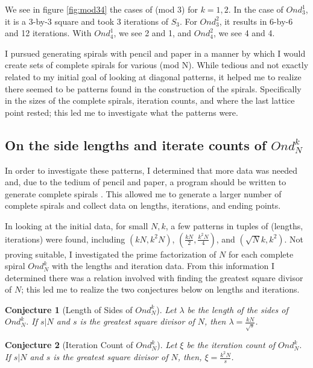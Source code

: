 \documentclass[11pt]{amsart}
\theoremstyle{mydef}
\newtheorem{conj}{Conjecture}[section]
\begin{document}
We see in figure \ref{fig:mod34} the cases of (mod 3) for $k=1,2$.  In the case of $Ond^1_3$, it is a 3-by-3 square and took 3 iterations of $S_3$. For $Ond^2_3$, it results in 6-by-6 and 12 iterations. With $Ond^1_4$, we see 2 and 1, and $Ond^2_4$, we see 4 and 4.

I pursued generating spirals with pencil and paper in a manner by which I would create sets of complete spirals for various (mod N). While tedious and not exactly related to my initial goal of looking at diagonal patterns, it helped me to realize there seemed to be patterns found in the construction of the spirals. Specifically in the sizes of the complete spirals, iteration counts, and where the last lattice point rested; this led me to investigate what the patterns were.

\subsection{On the side lengths and iterate counts of $Ond^k_N$}
In order to investigate these patterns, I determined that more data was needed and, due to the tedium of pencil and paper, a program should be written to generate complete spirals \cite{PySquare}. This allowed me to generate a larger number of complete spirals and collect data on lengths, iterations, and ending points. 

In looking at the initial data, for small $N, k$, a few patterns in tuples of (lengths, iterations) were found, including $(kN, k^2N)$, $(\frac{kN}{2}, \frac{k^2N}{4})$, and $(\sqrt{N}k, k^2)$. Not proving suitable, I investigated the prime factorization of $N$ for each complete spiral $Ond^k_N$ with the lengths and iteration data. From this information I determined there was a relation involved with finding the greatest square divisor of $N$; this led me to realize the two conjectures below on lengths and iterations. 

\begin{conj}[Length of Sides of $Ond^k_N$]
Let $\lambda$ be the length of the sides of $Ond^k_N$. If $s \vert N$ and $s$ is the greatest square divisor of $N$, then $\lambda = \frac{kN}{\sqrt{s}}$.
\end{conj}

\begin{conj}[Iteration Count of $Ond^k_N$]
Let $\xi$ be the iteration count  of $Ond^k_N$. If $s \vert N$ and $s$ is the greatest square divisor of $N$,  then, $\xi = \frac{k^2N}{s}$.
\end{conj}
\end{document}
